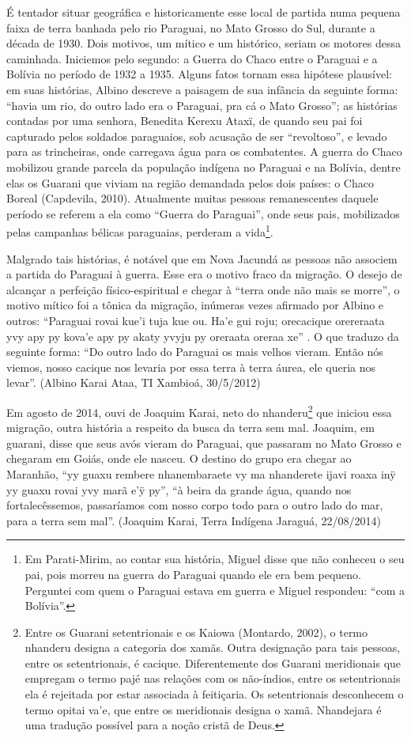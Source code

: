 É tentador situar geográfica e historicamente esse local de partida numa
pequena faixa de terra banhada pelo rio Paraguai, no Mato Grosso do
Sul, durante a década de 1930. Dois motivos, um mítico e um histórico,
seriam os motores dessa caminhada. Iniciemos pelo segundo: a Guerra do
Chaco entre o Paraguai e a Bolívia no período de 1932 a 1935. Alguns
fatos tornam essa hipótese plausível: em suas histórias, Albino
descreve a paisagem de sua infância da seguinte forma: ``havia um rio,
do outro lado era o Paraguai, pra cá o Mato Grosso''; as histórias
contadas por uma senhora, Benedita Kerexu Ataxï, de quando seu pai foi
capturado pelos soldados paraguaios, sob acusação de ser ``revoltoso'', e
levado para as trincheiras, onde carregava água para os combatentes. A
guerra do Chaco mobilizou grande parcela da população indígena no
Paraguai e na Bolívia, dentre elas os Guarani que viviam na região
demandada pelos dois países: o Chaco Boreal (Capdevila, 2010).
Atualmente muitas pessoas remanescentes daquele período se referem a
ela como ``Guerra do Paraguai'', onde seus pais, mobilizados pelas
campanhas bélicas paraguaias, perderam a vida\footnote{Em Parati-Mirim,
ao contar sua história, Miguel disse que não conheceu o seu pai, pois
morreu na guerra do Paraguai quando ele era bem pequeno. Perguntei com
quem o Paraguai estava em guerra e Miguel respondeu: ``com a Bolívia''.}.

Malgrado tais histórias, é notável que em Nova Jacundá as pessoas não
associem a partida do Paraguai à guerra. Esse era o motivo fraco da
migração. O desejo de alcançar a perfeição físico-espiritual e chegar à
``terra onde não mais se morre'', o motivo mítico foi a tônica da
migração, inúmeras vezes afirmado por Albino e outros: ``Paraguai rovai
kue’i tuja kue ou. Ha’e gui roju; orecacique orereraata yvy apy py
kova’e apy py akaty yvyju py oreraata oreraa xe'' . O que traduzo da
seguinte forma: ``Do outro lado do Paraguai os mais velhos vieram. Então
nós viemos, nosso cacique nos levaria por essa terra à terra áurea, ele
queria nos levar''. (Albino Karai Ataa, TI Xambioá, 30/5/2012)

Em agosto de 2014, ouvi de Joaquim Karai, neto do
nhanderu\footnote{Entre os Guarani setentrionais e os Kaiowa (Montardo,
2002), o termo nhanderu designa a categoria dos xamãs. Outra designação
para tais pessoas, entre os setentrionais, é cacique. Diferentemente
dos Guarani meridionais que empregam o termo pajé nas relações com os
não-índios, entre os setentrionais ela é rejeitada por estar associada à
feitiçaria. Os setentrionais desconhecem o termo opitai va’e, que entre
os meridionais designa o xamã. Nhandejara é uma tradução possível para
a noção cristã de Deus.} que iniciou essa migração, outra história a
respeito da busca da terra sem mal. Joaquim, em guarani, disse que seus
avós vieram do Paraguai, que passaram no Mato Grosso e chegaram em
Goiás, onde ele nasceu. O destino do grupo era chegar ao Maranhão, ``yy
guaxu rembere nhanembaraete vy ma nhanderete ijavi roaxa inÿ yy guaxu
rovai yvy marã e’ÿ py'', ``à beira da grande água, quando nos
fortalecêssemos, passaríamos com nosso corpo todo para o outro lado do
mar, para a terra sem mal''. (Joaquim Karai, Terra Indígena Jaraguá,
22/08/2014)

